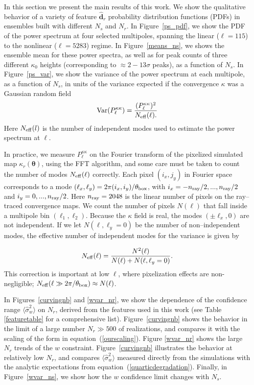 \documentclass[reprint,aps,prd,superscriptaddress,showkeys,showpacs]{revtex4-1}
\newcommand{\bbh}[1]{\mathbf{\hat{#1}}}
\newcommand{\h}[1]{\hat{#1}}
\begin{document}

In this section we present the main results of this work. We show the
qualitative behavior of a variety of feature $\bbh{d}_r$ probability
distribution functions (PDFs) in ensembles built with different $N_s$
and $N_r$. In Figure~\ref{ps_pdf}, we show the PDF of the power
spectrum at four selected multipoles, spanning the linear ($\ell=115$)
to the nonlinear ($\ell=5283$) regime. In Figure~\ref{means_ns}, we
shows the ensemble mean for these power spectra, as well as for peak
counts of three different $\kappa_0$ heights (corresponding to
$\approx 2-13\sigma$ peaks), as a function of $N_s$.  In
Figure~\ref{ps_var}, we show the variance of the power spectrum at
each multipole, as a function of $N_s$, in units of the variance
expected if the convergence $\kappa$ was a Gaussian random field
%
\begin{equation}
\label{gaussianvar}
\mathrm{Var}(P^{\kappa\kappa}_\ell) = \frac{(P^{\kappa\kappa}_\ell)^2}{N_{\rm eff}(\ell).}
\end{equation}
%
Here $N_{\rm eff}(l)$ is the number of independent modes used to
estimate the power spectrum at $\ell$.  

In practice, we measure $P^{\kappa\kappa}_\ell$ on the Fourier
transform of the pixelized simulated map $\kappa_r(\pmb{\theta})$,
using the FFT algorithm, and some care must be taken to count the
number of modes $N_{\rm eff}(\ell)$ correctly. Each pixel $(i_x,j_y)$
in Fourier space corresponds to a mode
$(\ell_x,\ell_y)=2\pi(i_x,i_y)/\theta_{\rm box}$, with $i_x=-n_{\rm
  ray}/2,...,n_{\rm ray}/2$ and $i_y=0,...,n_{\rm ray}/2$.  Here
$n_{\rm ray}=2048$ is the linear number of pixels on the ray--traced
convergence maps.  We count the number of pixels $N(\ell)$ that fall
inside a multipole bin $(\ell_1,\ell_2)$. Because the $\kappa$ field
is real, the modes $(\pm \ell_x,0)$ are not independent. If we let
$N(\ell,\ell_y=0)$ be the number of non--independent modes, the
effective number of independent modes for the variance is given by

\begin{equation}
N_{\rm eff}(\ell) = \frac{N^2(\ell)}{N(\ell)+N(\ell,\ell_y=0)}.
\end{equation}
%
This correction is important at low $\ell$, where pixelization effects
are non-negligible; $N_{\rm eff}(\ell\gg2\pi/\theta_{\rm box})\approx
N(\ell)$.

In Figures~\ref{curvingnb} and \ref{wvar_nr}, we show the dependence
of the confidence range $\langle\h{\sigma}^2_w\rangle$ on $N_r$,
derived from the features used in this work (see Table
\ref{featuretable} for a comprehensive list). 
Figure~\ref{curvingnb} shows the
behavior in the limit of a large number $N_r\gg500$ of realizations,
and compares it with the scaling of the form in
equation~(\ref{ourscaling}).
Figure \ref{wvar_nr} shows the large $N_r$ trends of the $w$ constraint.
Figure~\ref{curvingnb} illustrates the behavior at relatively low
$N_r$, and compares $\langle\h{\sigma}^2_w\rangle$ measured directly
from the simulations with the analytic expectations from
equation~(\ref{quarticdegradation}). Finally, in Figure~\ref{wvar_ns}, we show
how the $w$ confidence limit changes with $N_s$.
\end{document}

